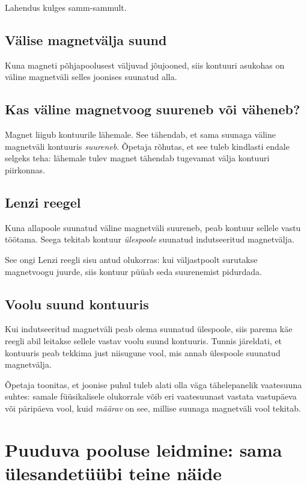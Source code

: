 \documentclass[a4paper,11pt]{article}
\begin{document}
Lahendus kulges samm-sammult.

\subsection{Välise magnetvälja suund}

Kuna magneti põhjapoolusest väljuvad jõujooned, siis kontuuri asukohas on väline magnetväli selles joonises suunatud alla.

\subsection{Kas väline magnetvoog suureneb või väheneb?}

Magnet liigub kontuurile lähemale. See tähendab, et sama suunaga väline magnetväli kontuuris \emph{suureneb}. Õpetaja rõhutas, et see tuleb kindlasti endale selgeks teha: lähemale tulev magnet tähendab tugevamat välja kontuuri piirkonnas.

\subsection{Lenzi reegel}

Kuna allapoole suunatud väline magnetväli suureneb, peab kontuur sellele vastu töötama. Seega tekitab kontuur \emph{ülespoole} suunatud indutseeritud magnetvälja.

See ongi Lenzi reegli sisu antud olukorras: kui väljastpoolt surutakse magnetvoogu juurde, siis kontuur püüab seda suurenemist pidurdada.

\subsection{Voolu suund kontuuris}

Kui indutseeritud magnetväli peab olema suunatud ülespoole, siis parema käe reegli abil leitakse sellele vastav voolu suund kontuuris. Tunnis järeldati, et kontuuris peab tekkima just niisugune vool, mis annab ülespoole suunatud magnetvälja.

Õpetaja toonitas, et joonise puhul tuleb alati olla väga tähelepanelik vaatesuuna suhtes: samale füüsikalisele olukorrale võib eri vaatesuunast vastata vastupäeva või päripäeva vool, kuid \emph{määrav} on see, millise suunaga magnetväli vool tekitab.

\section{Puuduva pooluse leidmine: sama ülesandetüübi teine näide}
\end{document}
